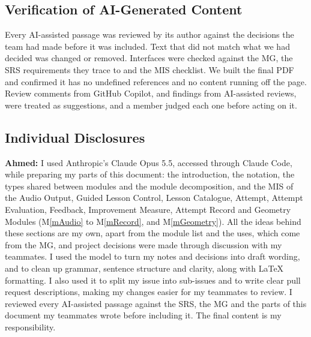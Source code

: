 \documentclass[12pt, titlepage]{article}
\newcommand{\mref}[1]{M\ref{#1}}
\begin{document}
\subsection{Verification of AI-Generated Content}

Every AI-assisted passage was reviewed by its author against the decisions the
team had made before it was included. Text that did not match what we had
decided was changed or removed. Interfaces were checked against the MG, the SRS
requirements they trace to and the MIS checklist. We built the final PDF and
confirmed it has no undefined references and no content running off the page.
Review comments from GitHub Copilot, and findings from AI-assisted reviews,
were treated as suggestions, and a member judged each one before acting on it.

\subsection*{Individual Disclosures}

\textbf{Ahmed:} I used Anthropic's Claude Opus 5.5, accessed through Claude
Code, while preparing my parts of this document: the introduction, the
notation, the types shared between modules and the module decomposition, and
the MIS of the Audio Output, Guided Lesson Control, Lesson Catalogue, Attempt,
Attempt Evaluation, Feedback, Improvement Measure, Attempt Record and Geometry
Modules (\mref{mAudio} to \mref{mRecord}, and \mref{mGeometry}). All the ideas
behind these sections are my own, apart from the module list and the uses,
which come from the MG, and project decisions were made through discussion with
my teammates. I used the model to turn my notes and decisions
into draft wording, and to clean up grammar, sentence structure and clarity,
along with \LaTeX{} formatting. I also used it to split my issue into
sub-issues and to write clear pull request descriptions, making my changes
easier for my teammates to review. I reviewed every AI-assisted passage against
the SRS, the MG and the parts of this document my teammates wrote before
including it. The final content is my responsibility.
\end{document}
